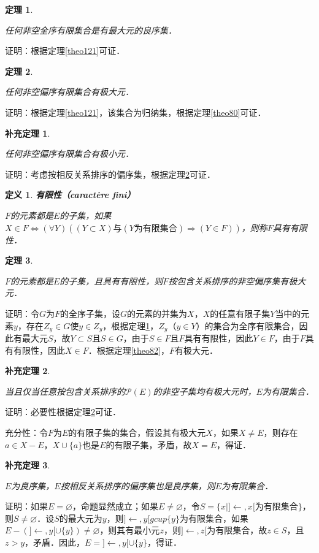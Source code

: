 \documentclass[12pt, a4paper, oneside]{book}
\newtheorem{theo}{定理}
\newtheorem{cor}{补充定理}
\newtheorem{de}{定义}
\begin{document}
			\begin{theo}\label{theo122}
				\hfill\par
				任何非空全序有限集合是有最大元的良序集．
			\end{theo}
			证明：根据定理\ref{theo121}可证．
						
			\begin{theo}\label{theo123}
				\hfill\par
				任何非空偏序有限集合有极大元．
			\end{theo}
			证明：根据定理\ref{theo121}，该集合为归纳集，根据定理\ref{theo80}可证．
			
			\begin{cor}\label{cor303}
				\hfill\par
				任何非空偏序有限集合有极小元．
			\end{cor}
			证明：考虑按相反关系排序的偏序集，根据定理\ref{theo123}可证．
						
			\begin{de}
				\textbf{有限性（caractère fini）}
				\par
				$F$的元素都是$E$的子集，如果$X\in F\Leftrightarrow (\forall Y)((Y\subset X)\text{与}(Y\text{为有限集合})\Rightarrow (Y\in F))$，则称$F$具有有限性．
			\end{de}
						
			\begin{theo}\label{theo124}
				\hfill\par
				$F$的元素都是$E$的子集，且具有有限性，则$F$按包含关系排序的非空偏序集有极大元．
			\end{theo}
			证明：令$G$为$F$的全序子集，设$G$的元素的并集为$X$，$X$的任意有限子集$Y$当中的元素$y$，存在$Z_y\in G$使$y\in Z_y$，根据定理\ref{theo122}，$Z_y$（$y\in Y$）的集合为全序有限集合，因此有最大元$S$，故$Y\subset S$且$S\in G$，由于$S\in F$且$F$具有有限性，因此$Y\in F$，由于$F$具有有限性，因此$X\in F$．根据定理\ref{theo82}，$F$有极大元．
						
			\begin{cor}\label{cor304}
				\hfill\par
				当且仅当任意按包含关系排序的$\mathcal{P}(E)$的非空子集均有极大元时，$E$为有限集合．
			\end{cor}
			证明：必要性根据定理\ref{theo123}可证．
			\par
			充分性：令$F$为$E$的有限子集的集合，假设其有极大元$X$，如果$X\neq E$，则存在$a\in X-E$，$X\cup\{a\}$也是$E$的有限子集，矛盾，故$X=E$，得证．
						
			\begin{cor}\label{cor305}
				\hfill\par
				$E$为良序集，$E$按相反关系排序的偏序集也是良序集，则$E$为有限集合．
			\end{cor}
			证明：如果$E=\varnothing$，命题显然成立；如果$E\neq \varnothing$，令$S=\{x|]\gets, x[\text{为有限集合}\}$，则$S\neq \varnothing$．设$S$的最大元为$y$，则$]\gets, y[gcup\{y\}$为有限集合，如果$E-(]\gets, y[\cup\{y\})\neq \varnothing$，则其有最小元$z$，则$] \gets, z[$为有限集合，故$z\in S$，且$z>y$，矛盾．因此，$E=]\gets, y[\cup\{y\}$，得证．
			
\end{document}

